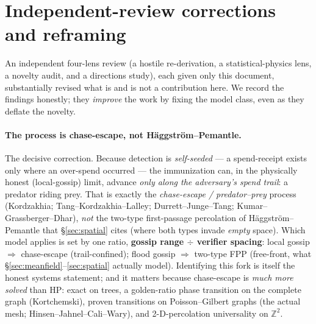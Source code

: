 \documentclass[11pt]{article}
\theoremstyle{plain}
\theoremstyle{definition}
\begin{document}
\section{Independent-review corrections and reframing}\label{sec:review}

An independent four-lens review (a hostile re-derivation, a statistical-physics
lens, a novelty audit, and a directions study), each given only this document,
substantially revised what is and is not a contribution here. We record the
findings honestly; they \emph{improve} the work by fixing the model class, even as
they deflate the novelty.

\paragraph{The process is chase-escape, not Häggström--Pemantle.}\label{par:chaseescape}
The decisive correction. Because detection is \emph{self-seeded} --- a
spend-receipt exists only where an over-spend occurred --- the immunization can, in
the physically honest (local-gossip) limit, advance \emph{only along the
adversary's spend trail}: a predator riding prey. That is exactly the
\emph{chase-escape / predator--prey} process (Kordzakhia; Tang--Kordzakhia--Lalley;
Durrett--Junge--Tang; Kumar--Grassberger--Dhar), \emph{not} the two-type
first-passage percolation of Häggström--Pemantle that \S\ref{sec:spatial} cites
(where both types invade \emph{empty} space). Which model applies is set by one
ratio, \textbf{gossip range $\div$ verifier spacing}: local gossip
$\Rightarrow$ chase-escape (trail-confined); flood gossip $\Rightarrow$ two-type
FPP (free-front, what \S\ref{sec:meanfield}--\ref{sec:spatial} actually model).
Identifying this fork is itself the honest systems statement; and it matters
because chase-escape is \emph{much more solved} than HP: exact on trees, a
golden-ratio phase transition on the complete graph (Kortchemski), proven
transitions on Poisson--Gilbert graphs (the actual mesh; Hinsen--Jahnel--Cali--Wary),
and 2-D-percolation universality on $\mathbb{Z}^2$.
\end{document}
